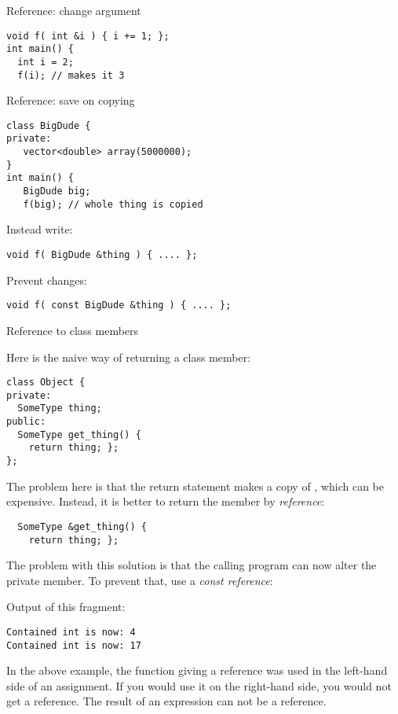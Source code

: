 \begin{block}{Reference: change argument}
\label{sl:refarg-change}
\begin{verbatim}
void f( int &i ) { i += 1; };
int main() {
  int i = 2;
  f(i); // makes it 3
\end{verbatim}
\end{block}

\begin{block}{Reference: save on copying}
\label{sl:refarg-nocopy}
\begin{verbatim}
class BigDude {
private:
   vector<double> array(5000000);
}
int main() {
   BigDude big;
   f(big); // whole thing is copied
\end{verbatim}
Instead write:
\begin{verbatim}
void f( BigDude &thing ) { .... };
\end{verbatim}
Prevent changes:
\begin{verbatim}
void f( const BigDude &thing ) { .... };
\end{verbatim}
\end{block}

 {Reference to class members}
\label{sec:class-ref}

Here is the naive way of returning a class member:
\begin{verbatim}
class Object {
private:
  SomeType thing;
public:
  SomeType get_thing() {
    return thing; };
};
\end{verbatim}
The problem here is that the return statement makes a copy of
, which can be expensive. Instead, it is better to return the
member by \emph{reference}:
\begin{verbatim}
  SomeType &get_thing() { 
    return thing; };
\end{verbatim}
The problem with this solution is that the calling program can now
alter the private member. To prevent that, use a
\emph{const reference}:
%

Output of this fragment:
\begin{verbatim}
Contained int is now: 4
Contained int is now: 17
\end{verbatim}

In the above example, the function giving a reference was used in the left-hand side of
an assignment. If you would use it on the right-hand side, you would
not get a reference. The result of an expression can not be a
reference.

